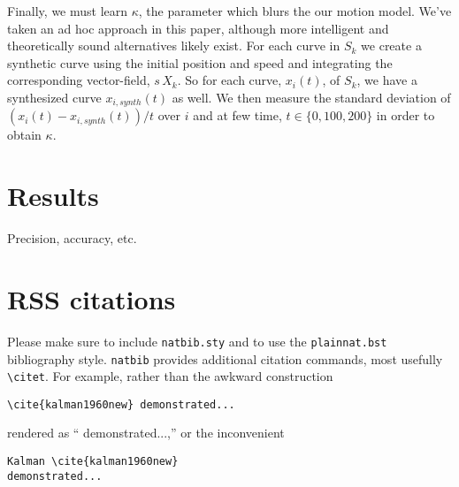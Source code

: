 \documentclass[conference]{IEEEtran}
\begin{document}
  Finally, we must learn $\kappa$, the parameter which blurs the our motion model.
  We've taken an ad hoc approach in this paper, although more intelligent and theoretically sound alternatives likely exist.
  For each curve in $S_k$ we create a synthetic curve using the initial position and speed and integrating the corresponding vector-field, $s\, X_k$.
  So for each curve, $x_i(t)$, of $S_k$, we have a synthesized curve $x_{i,synth}(t)$ as well.
  We then measure the standard deviation of $(x_i(t) - x_{i,synth}(t)) / t$ over $i$ and at few time, $t \in \{ 0, 100, 200 \}$ in order to obtain $\kappa$.
  

%  
  
\section{Results}
 Precision, accuracy, etc.

\section{RSS citations}

Please make sure to include \verb!natbib.sty! and to use the
\verb!plainnat.bst! bibliography style. \verb!natbib! provides additional
citation commands, most usefully \verb!\citet!. For example, rather than the
awkward construction 

{\small
\begin{verbatim}
\cite{kalman1960new} demonstrated...
\end{verbatim}
}

\noindent
rendered as ``\cite{kalman1960new} demonstrated...,''
or the
inconvenient 

{\small
\begin{verbatim}
Kalman \cite{kalman1960new} 
demonstrated...
\end{verbatim}
}
\end{document}
